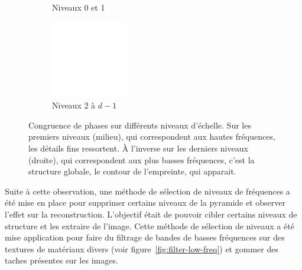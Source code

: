 \begin{figure}
\begin{subfigure}[b]{.25\textwidth}
        \caption{Niveaux 0 et 1}
    \end{subfigure}
    \hfill
    \begin{subfigure}[b]{.25\textwidth}
        \centering
        \includegraphics[width=\textwidth]{contenu/resources/images/pc_layer_2_depth-1}
        \caption{Niveaux 2 à $d-1$}
    \end{subfigure}

    \caption[Congruence de phases sur différents niveaux d'échelle]{Congruence de phases sur différents niveaux d'échelle. Sur les premiers niveaux (milieu), qui correspondent aux hautes fréquences, les détails fins ressortent. À l'inverse sur les derniers niveaux (droite), qui correspondent aux plus basses fréquences, c'est la structure globale, le contour de l'empreinte, qui apparait.}
    \label{fig:pc-selection-niveaux}
\end{figure}

Suite à cette observation, une méthode de sélection de niveaux de fréquences a été mise en place pour supprimer certains niveaux de la pyramide et observer l'effet sur la reconstruction. L'objectif était de pouvoir cibler certains niveaux de structure et les extraire de l'image. Cette méthode de sélection de niveaux a été mise application pour faire du filtrage de bandes de basses fréquences sur des textures de matériaux divers (voir figure~\ref{fig:filter-low-freq}) et gommer des taches présentes sur les images.


